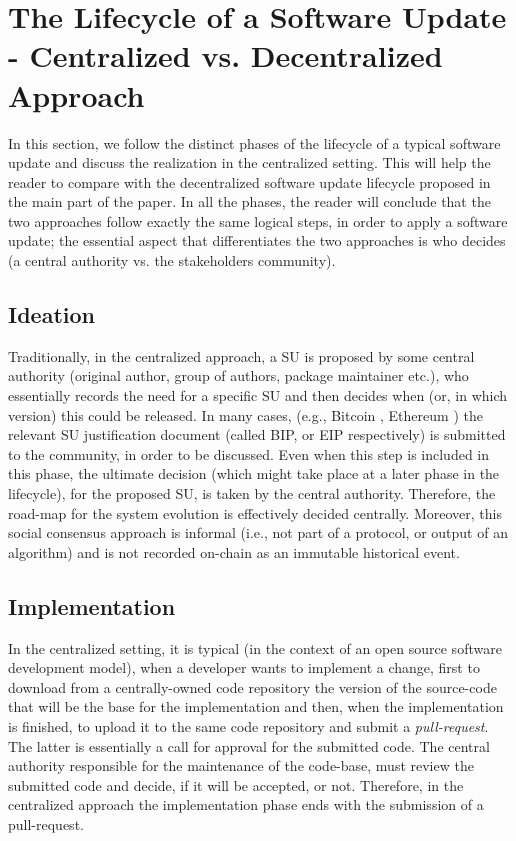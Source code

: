 \section{The Lifecycle of a Software Update - Centralized vs. Decentralized Approach} \label{appxlifecycle}
In this section, we follow the distinct phases of the lifecycle of a typical software update and discuss the realization in the centralized setting.  This will help the reader to compare with the decentralized software update lifecycle proposed in the main part of the paper. In all the phases, the reader will conclude that the two approaches follow exactly the same logical steps, in order to apply a software update; the essential aspect that differentiates the two approaches is who decides (a central authority vs. the stakeholders community).
 
\subsection{Ideation}
Traditionally, in the centralized approach, a SU is proposed by some central authority (original author, group of authors, package maintainer etc.), who essentially records the need for a specific SU and then decides when (or, in which version) this could be released. In many cases, (e.g., Bitcoin \cite{bitcoin}, Ethereum \cite{ethereum}) the relevant SU justification document (called BIP, or EIP respectively) is submitted to the community, in order to be discussed. Even when this  step is included in this phase, the ultimate decision (which might take place at a later phase in the lifecycle), for the proposed SU, is taken by the central authority. Therefore, the road-map for the system evolution is effectively decided centrally. Moreover, this social consensus approach is informal (i.e., not part of a protocol, or output of an algorithm) and is not recorded on-chain as an immutable historical event.

\subsection{Implementation}
In the centralized setting, it is typical (in the context of an open source software development model), when a developer wants to implement a change, first to download from a centrally-owned code repository the version of the source-code that will be the base for the implementation and then, when the implementation is finished, to upload it to the same code repository and submit a \emph{pull-request}. The latter is essentially a call for approval for the submitted code. The central authority responsible for the maintenance of the code-base, must review the submitted code and decide, if it will be accepted, or not. Therefore, in the centralized approach the implementation phase ends with the submission of a pull-request.

